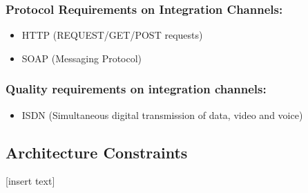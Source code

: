 \documentclass[11pt]{article}
\begin{document}
			\subsubsection{Protocol Requirements on Integration Channels:}
			\begin{itemize}			
			
				\item HTTP (REQUEST/GET/POST requests)
				\item SOAP (Messaging Protocol)
				
			\end{itemize}	
			
			\subsubsection{Quality requirements on integration channels:}
			\begin{itemize}			
			
				\item ISDN (Simultaneous digital transmission of data, video and voice)
				
			\end{itemize}	

	\newpage
	\begin{center}
	\section{\textbf{\huge{Architecture Constraints}}}
	\end{center}
	
	[insert text]
\end{document}

